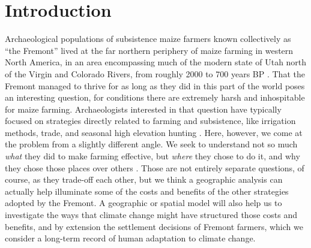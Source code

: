 \documentclass[
  number,
  preprint,
  3p]{elsarticle}
\begin{document}
    \ifdefined\Shaded\renewenvironment{Shaded}{\begin{tcolorbox}[boxrule=0pt, interior hidden, breakable, sharp corners, enhanced, borderline west={3pt}{0pt}{shadecolor}, frame hidden]}{\end{tcolorbox}}\fi

\hypertarget{introduction}{%
\section{Introduction}\label{introduction}}

Archaeological populations of subsistence maize farmers known
collectively as ``the Fremont'' lived at the far northern periphery of
maize farming in western North America, in an area encompassing much of
the modern state of Utah north of the Virgin and Colorado Rivers, from
roughly 2000 to 700 years BP \citep{madsen1989, madsen1998}. That the
Fremont managed to thrive for as long as they did in this part of the
world poses an interesting question, for conditions there are extremely
harsh and inhospitable for maize farming. Archaeologists interested in
that question have typically focused on strategies directly related to
farming and subsistence, like irrigation methods, trade, and seasonal
high elevation hunting
\citep[e.g.,][]{barlow2008, boomgarden2019, janetski2002, hart2021, madsen1998, metcalfe1985, patterson2010, spangler1993, morgan2012}.
Here, however, we come at the problem from a slightly different angle.
We seek to understand not so much \emph{what} they did to make farming
effective, but \emph{where} they chose to do it, and why they chose
those places over others \citep[e.g.,][]{bocinsky2014, thomson2020}.
Those are not entirely separate questions, of course, as they trade-off
each other, but we think a geographic analysis can actually help
illuminate some of the costs and benefits of the other strategies
adopted by the Fremont. A geographic or spatial model will also help us
to investigate the ways that climate change might have structured those
costs and benefits, and by extension the settlement decisions of Fremont
farmers, which we consider a long-term record of human adaptation to
climate change.
\end{document}
